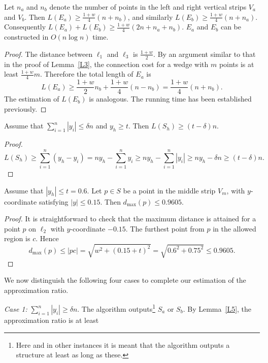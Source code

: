 \documentclass[proceedings]{stacs}
\begin{document}
\begin{lemma} \label{L6}
Let $n_a$ and $n_b$ denote the number of points in the left and right
vertical strips $V_a$ and $V_b$. Then $L(E_a) \geq \frac{1+w}{4} (n+n_b)$,
and similarly $L(E_b) \geq \frac{1+w}{4} (n+n_a)$. Consequently
$ L(E_a) + L(E_b) \geq \frac{1+w}{4} (2n+n_a+n_b)$.
$E_a$ and $E_b$ can be constructed in $O(n \log{n})$ time.
\end{lemma}
\begin{proof}
The distance between $\ell_1$ and $\ell_3$ is $\frac{1+w}{2}$.
By an argument similar to that in the proof of Lemma~\ref{L3},
the connection cost for a wedge with $m$ points is
at least $\frac{1+w}{4}m$. Therefore the total length of $E_a$ is
$$ L(E_a) \geq \frac{1+w}{2}n_b + \frac{1+w}{4}(n-n_b)=
\frac{1+w}{4} (n+n_b). $$
The estimation of $L(E_b)$ is analogous. The running time has been
established previously.
\end{proof}


\begin{lemma} \label{L7}
Assume that $\sum_{i=1}^n |y_i| \leq \delta n$ and $y_h \geq t$.
Then $L(S_h) \geq (t-\delta)n$.
\end{lemma}
\begin{proof}
\[ L(S_h) \geq  \sum_{i=1}^n (y_h - y_i)= n y_h - \sum_{i=1}^n  y_i
\geq n y_h - \sum_{i=1}^n  |y_i| \geq n y_h - \delta n
\geq (t-\delta)n. \]

\vspace{-1.5\baselineskip}
\end{proof}


\begin{lemma} \label{L8}
Assume that $|y_h| \leq t=0.6$.
Let $p \in S$ be a point in the middle strip $V_m$, with $y$-coordinate
satisfying $|y| \leq 0.15$. Then $d_\textrm{max}(p) \leq 0.9605$.
\end{lemma}
\begin{proof}
It is straightforward to check that the maximum distance is attained
for a point $p$ on $\ell_2$ with $y$-coordinate $-0.15$.
The furthest point from $p$ in the allowed region is $c$. Hence
\[ d_\textrm{max}(p) \leq |pc| = \sqrt{w^2 + (0.15+ t)^2} =
\sqrt{0.6^2 + 0.75^2} \leq 0.9605. \]

\vspace{-1.5\baselineskip}
\end{proof}


We now distinguish the following four cases to complete our
estimation of the approximation ratio.


\smallskip
{\em Case 1:} $\sum_{i=1}^n |y_i| \geq \delta n$. The algorithm
outputs\footnote{Here and in other instances it is meant that the
algorithm outputs a structure at least as long as these.}
$S_a$ or $S_b$. By Lemma~\ref{L5}, the approximation ratio is
at least
\end{document}
